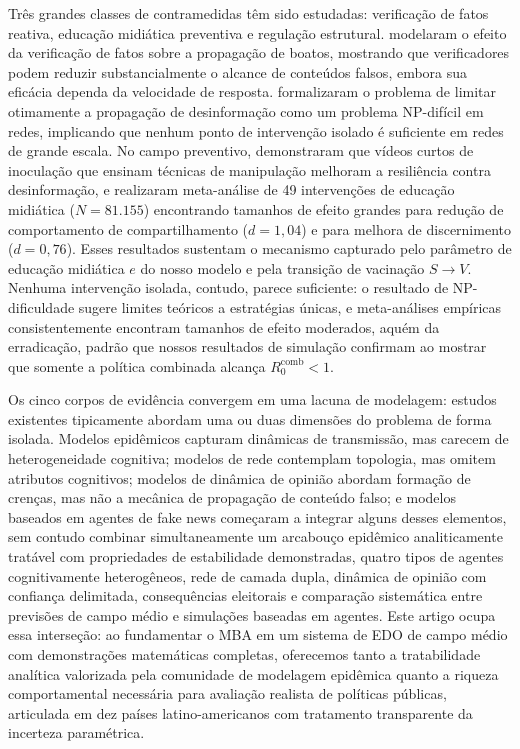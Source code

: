 \documentclass[12pt,a4paper]{article}
\theoremstyle{definition}
\theoremstyle{plain}
\begin{document}
Três grandes classes de contramedidas têm sido estudadas: verificação de fatos reativa, educação midiática preventiva e regulação estrutural. \citet{tambuscio2015fact} modelaram o efeito da verificação de fatos sobre a propagação de boatos, mostrando que verificadores podem reduzir substancialmente o alcance de conteúdos falsos, embora sua eficácia dependa da velocidade de resposta. \citet{budak2011limiting} formalizaram o problema de limitar otimamente a propagação de desinformação como um problema NP-difícil em redes, implicando que nenhum ponto de intervenção isolado é suficiente em redes de grande escala. No campo preventivo, \citet{roozenbeek2022psychological} demonstraram que vídeos curtos de inoculação que ensinam técnicas de manipulação melhoram a resiliência contra desinformação, e \citet{huang2024media} realizaram meta-análise de 49 intervenções de educação midiática ($N = 81{.}155$) encontrando tamanhos de efeito grandes para redução de comportamento de compartilhamento ($d = 1{,}04$) e para melhora de discernimento ($d = 0{,}76$). Esses resultados sustentam o mecanismo capturado pelo parâmetro de educação midiática $e$ do nosso modelo e pela transição de vacinação $S \to V$. Nenhuma intervenção isolada, contudo, parece suficiente: o resultado de NP-dificuldade sugere limites teóricos a estratégias únicas, e meta-análises empíricas consistentemente encontram tamanhos de efeito moderados, aquém da erradicação, padrão que nossos resultados de simulação confirmam ao mostrar que somente a política combinada alcança $R_0^{\text{comb}} < 1$.

Os cinco corpos de evidência convergem em uma lacuna de modelagem: estudos existentes tipicamente abordam uma ou duas dimensões do problema de forma isolada. Modelos epidêmicos capturam dinâmicas de transmissão, mas carecem de heterogeneidade cognitiva; modelos de rede contemplam topologia, mas omitem atributos cognitivos; modelos de dinâmica de opinião abordam formação de crenças, mas não a mecânica de propagação de conteúdo falso; e modelos baseados em agentes de fake news \citep{franceschi2022agent, ross2019spread, tornberg2018echo} começaram a integrar alguns desses elementos, sem contudo combinar simultaneamente um arcabouço epidêmico analiticamente tratável com propriedades de estabilidade demonstradas, quatro tipos de agentes cognitivamente heterogêneos, rede de camada dupla, dinâmica de opinião com confiança delimitada, consequências eleitorais e comparação sistemática entre previsões de campo médio e simulações baseadas em agentes. Este artigo ocupa essa interseção: ao fundamentar o MBA em um sistema de EDO de campo médio com demonstrações matemáticas completas, oferecemos tanto a tratabilidade analítica valorizada pela comunidade de modelagem epidêmica quanto a riqueza comportamental necessária para avaliação realista de políticas públicas, articulada em dez países latino-americanos com tratamento transparente da incerteza paramétrica.
\end{document}
